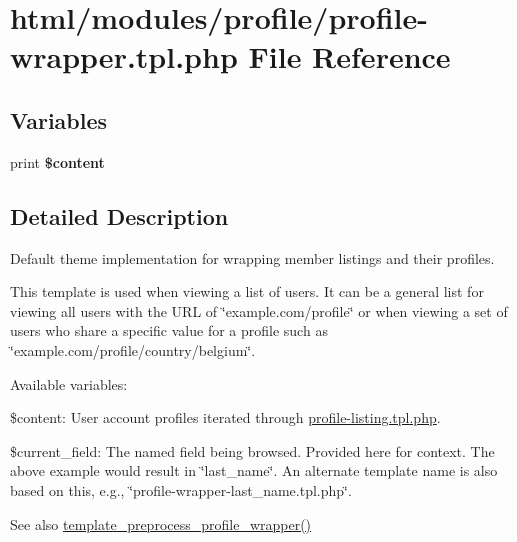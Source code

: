 \hypertarget{profile-wrapper_8tpl_8php}{
\section{html/modules/profile/profile-\/wrapper.tpl.php File Reference}
\label{profile-wrapper_8tpl_8php}
}
\subsection*{Variables}
\begin{DoxyCompactItemize}
\item 
\hypertarget{profile-wrapper_8tpl_8php_ab7b7210f43aa78e34f0b202de894a74c}{
print {\bfseries \$content}}
\label{profile-wrapper_8tpl_8php_ab7b7210f43aa78e34f0b202de894a74c}

\end{DoxyCompactItemize}


\subsection{Detailed Description}
Default theme implementation for wrapping member listings and their profiles.

This template is used when viewing a list of users. It can be a general list for viewing all users with the URL of \char`\"{}example.com/profile\char`\"{} or when viewing a set of users who share a specific value for a profile such as \char`\"{}example.com/profile/country/belgium\char`\"{}.

Available variables:
\begin{DoxyItemize}
\item \$content: User account profiles iterated through \hyperlink{profile-listing_8tpl_8php}{profile-\/listing.tpl.php}.
\item \$current\_\-field: The named field being browsed. Provided here for context. The above example would result in \char`\"{}last\_\-name\char`\"{}. An alternate template name is also based on this, e.g., \char`\"{}profile-\/wrapper-\/last\_\-name.tpl.php\char`\"{}.
\end{DoxyItemize}

\begin{DoxySeeAlso}{See also}
\hyperlink{profile_8module_af0ca4c9b63d8be38a0c7f354bf94ab6e}{template\_\-preprocess\_\-profile\_\-wrapper()} 
\end{DoxySeeAlso}

